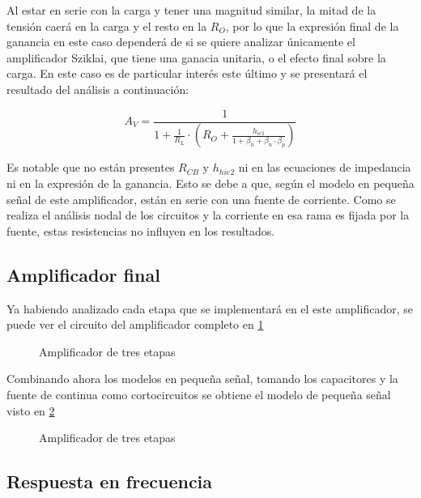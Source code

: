 Al estar en serie con la carga y tener una magnitud similar, la mitad de la tensión caerá en la carga y el resto en la $R_O$, por lo  que la expresión final de la ganancia en este caso dependerá de si se quiere analizar únicamente el amplificador Sziklai, que tiene una ganacia unitaria, o el efecto final sobre la carga. En este caso es de particular interés este último y se presentará el resultado del análisis a continuación:

\begin{equation}
  A_V = \frac{1}{1+\frac{1}{R_L}\cdot(R_O+\frac{h_{ie1}}{1+\beta_n+\beta_n\cdot\beta_p})}
  \label{AvSz}
\end{equation}

Es notable que no están presentes $R_{CB}$ y $h_{hie2}$ ni en las ecuaciones de impedancia ni en la expresión de la ganancia. Esto se debe a que, según el modelo en pequeña señal de este amplificador, están en serie con una fuente de corriente. Como se realiza el análisis nodal de los circuitos y la corriente en esa rama es fijada por la fuente, estas resistencias no influyen en los resultados.

\subsection{Amplificador final}

Ya habiendo analizado cada etapa que se implementará en el este amplificador, se puede ver el circuito del amplificador completo en  \cref{fig:AmpTot}

\begin{figure}
	 \centering
	 \resizebox{\textwidth}{!}{
		
	}
    \caption{Amplificador de tres etapas}
    \label{fig:AmpTot}
\end{figure}

Combinando ahora los modelos en pequeña señal, tomando los capacitores y la fuente de continua como cortocircuitos se obtiene el modelo de pequeña señal visto en \cref{fig:AmpTotPS}

\begin{figure}
	 \centering
	 \resizebox{\textwidth}{!}{
		
	}
    \caption{Amplificador de tres etapas}
    \label{fig:AmpTotPS}
\end{figure}

\subsection{Respuesta en frecuencia }

